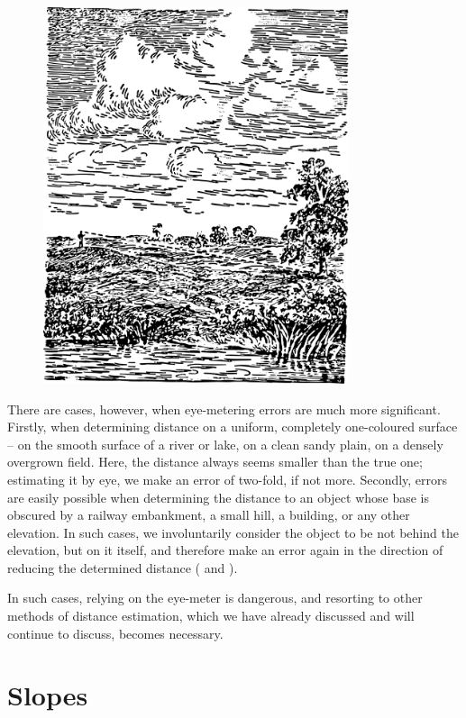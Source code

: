 \begin{figure}[h!]
\centering
\includegraphics[width=0.8\textwidth]{figures/ch-04/fig-080.pdf}
\end{figure}

There are cases, however, when eye-metering errors are much more significant. Firstly, when determining distance on a uniform, completely one-coloured surface -- on the smooth surface of a river or lake, on a clean sandy plain, on a densely overgrown field. Here, the distance always seems smaller than the true one; estimating it by eye, we make an error of two-fold, if not more. Secondly, errors are easily possible when determining the distance to an object whose base is obscured by a railway embankment, a small hill, a building, or any other elevation. In such cases, we involuntarily consider the object to be not behind the elevation, but on it itself, and therefore make an error again in the direction of reducing the determined distance ( and ).

In such cases, relying on the eye-meter is dangerous, and resorting to other methods of distance estimation, which we have already discussed and will continue to discuss, becomes necessary.


\section{Slopes}
\label{sec-4.3}

